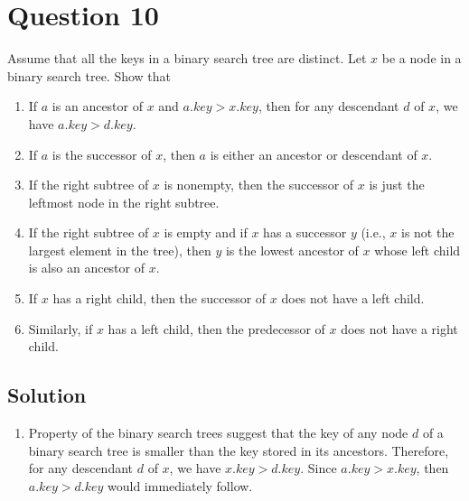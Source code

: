
\section*{Question 10}

Assume that all the keys in a binary search tree are distinct.
Let $x$ be a node in a binary search tree.
Show that
\begin{enumerate}
\item If $a$ is an ancestor of $x$ and $a.key > x.key$, then for any descendant $d$ of $x$, we have $a.key > d.key$.

\item If $a$ is the successor of $x$, then $a$ is either an ancestor or descendant of $x$.

\item If the right subtree of $x$ is nonempty, then the successor of $x$ is just the leftmost node in the right subtree.

\item If the right subtree of $x$ is empty and if $x$ has a successor $y$ (i.e., $x$ is not the largest element in the tree), then $y$ is the lowest ancestor of $x$ whose left child is also an ancestor of $x$.

\item If $x$ has a right child, then the successor of $x$ does not have a left child.

\item Similarly, if $x$ has a left child, then the predecessor of $x$ does not have a right child.
\end{enumerate}

\subsection*{Solution}

\begin{enumerate}
\item Property of the binary search trees suggest that the key of any node $d$ of a binary search tree is smaller than the key stored in its ancestors.
Therefore, for any descendant $d$ of $x$, we have $x.key > d.key$.
Since $a.key > x.key$, then $a.key > d.key$ would immediately follow.
\end{enumerate}
